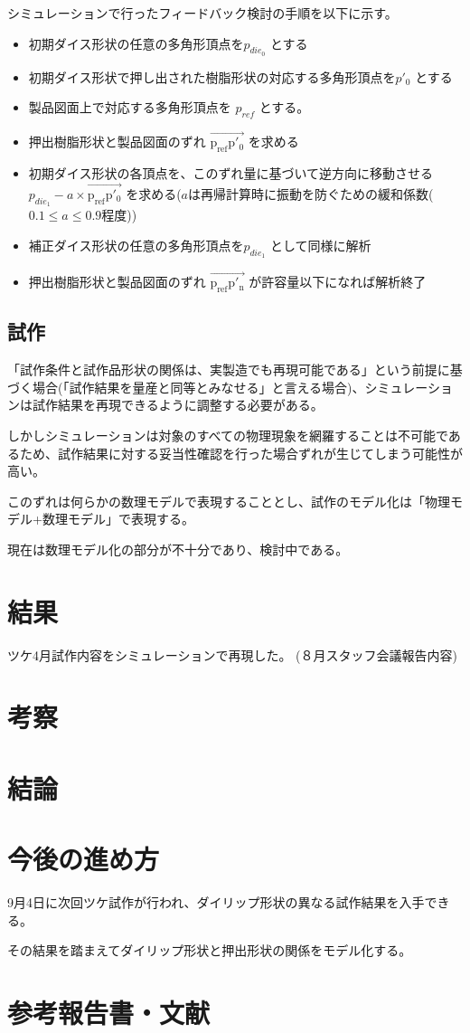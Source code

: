 \documentclass[report]{jlreq}
\begin{document}
シミュレーションで行ったフィードバック検討の手順を以下に示す。

\begin{itemize}
  \item 初期ダイス形状の任意の多角形頂点を$p_{die_0}$ とする
  \item 初期ダイス形状で押し出された樹脂形状の対応する多角形頂点を$p'_0$ とする
  \item 製品図面上で対応する多角形頂点を $p_{ref}$ とする。
  \item 押出樹脂形状と製品図面のずれ $\overrightarrow{\mathrm{p_{ref}  p'_0}}$ を求める
  \item 初期ダイス形状の各頂点を、このずれ量に基づいて逆方向に移動させる $ p_{die_1} - a\times \overrightarrow{\mathrm{p_{ref}  p'_0}}$ を求める({\small $a$は再帰計算時に振動を防ぐための緩和係数($0.1\leq a \leq0.9$程度)})
  \item 補正ダイス形状の任意の多角形頂点を$p_{die_1}$ として同様に解析
  \item 押出樹脂形状と製品図面のずれ $\overrightarrow{\mathrm{p_{ref}  p'_n}}$ が許容量以下になれば解析終了
\end{itemize}

\newpage

\section{試作}
「試作条件と試作品形状の関係は、実製造でも再現可能である」という前提に基づく場合({\small 「試作結果を量産と同等とみなせる」と言える場合})、シミュレーションは試作結果を再現できるように調整する必要がある。

しかしシミュレーションは対象のすべての物理現象を網羅することは不可能であるため、試作結果に対する妥当性確認を行った場合ずれが生じてしまう可能性が高い。

このずれは何らかの数理モデルで表現することとし、試作のモデル化は「物理モデル+数理モデル」で表現する。

現在は数理モデル化の部分が不十分であり、検討中である。



\chapter{結果}
ツケ4月試作内容をシミュレーションで再現した。
({\small ８月スタッフ会議報告内容})

\chapter{考察 }

\chapter{結論}

\chapter{今後の進め方}
9月4日に次回ツケ試作が行われ、ダイリップ形状の異なる試作結果を入手できる。

その結果を踏まえてダイリップ形状と押出形状の関係をモデル化する。


\chapter{参考報告書・文献}
\end{document}
